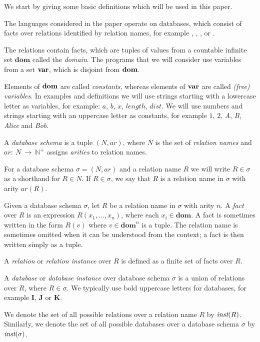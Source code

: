 We start by giving some basic definitions which will be used in this paper.

The languages considered in the paper operate on databases, which consist of facts over relations identified by relation names, for example , , ,  or .

The relations contain facts, which are tuples of values from a countable infinite set $\textbf{dom}$ called the \emph{domain}. The programs that we will consider use variables from a set $\bf{var}$, which is disjoint from $\bf{dom}$. 

Elements of $\bf{dom}$ are called \emph{constants}, whereas elements of $\bf{var}$ are called \emph{(free) variables}.
In examples and definitions we will use strings starting with a lowercase letter as variables, for example: $a$, $b$, $x$, $length$, $dist$. We will use numbers and strings starting with an uppercase letter as constants, for example $1$, $2$, \textit{A}, \textit{B}, \textit{Alice} and \textit{Bob}.

\begin{defn}

A \emph{database schema} is a tuple $(N, ar)$, where $N$ is the set of \emph{relation names} and $ar:~N~\to~\mathbb{N}^+$ assigns \emph{arities} to relation names. 

For a database schema $\sigma = (N, ar)$ and a relation name $R$ we will write $R \in \sigma$ as a shorthand for $R \in N$. If $R \in \sigma$, we say that $R$ is a relation name in $\sigma$ with arity $ar(R)$.

Given a database schema $\sigma$, let $R$ be a relation name in $\sigma$ with arity $n$. A \emph{fact} over $R$ is an expression $R(x_1 , \dots , x_n)$, where each $x_i \in \textbf{dom}$. A fact is sometimes written in the form $R(v)$ where $v \in \textbf{dom}^n$ is a tuple. The relation name is sometimes omitted when it can be understood from the context; a fact is then written simply as a tuple.

A \emph{relation} or \emph{relation instance} over $R$ is defined as a finite set of facts over $R$.

A \emph{database} or \emph{database instance} over database schema $\sigma$ is a union of relations over $R$, where $R \in \sigma$. We typically use bold uppercase letters for databases, for example $\textbf{I}$, $\textbf{J}$ or $\textbf{K}$. 

We denote the set of all possible relations over a relation name $R$ by $\textit{inst}(R)$. Similarly, we denote the set of all possible databases over a database schema $\sigma$ by $\textit{inst}(\sigma)$.
\end{defn}

